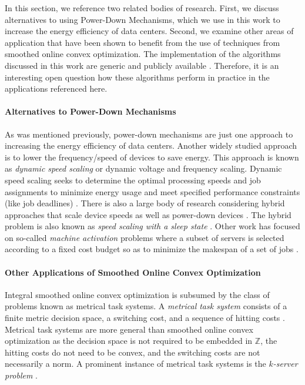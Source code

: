 In this section, we reference two related bodies of research. First, we discuss alternatives to using Power-Down Mechanisms, which we use in this work to increase the energy efficiency of data centers. Second, we examine other areas of application that have been shown to benefit from the use of techniques from smoothed online convex optimization. The implementation of the algorithms discussed in this work are generic and publicly available \cite{Hübotter2021}. Therefore, it is an interesting open question how these algorithms perform in practice in the applications referenced here.

\paragraph{Alternatives to Power-Down Mechanisms} As was mentioned previously, power-down mechanisms are just one approach to increasing the energy efficiency of data centers. Another widely studied approach is to lower the frequency/speed of devices to save energy. This approach is known as \emph{dynamic speed scaling} or dynamic voltage and frequency scaling. Dynamic speed scaling seeks to determine the optimal processing speeds and job assignments to minimize energy usage and meet specified performance constraints (like job deadlines) \cite{Albers2007, Albers2011, Jin2016}. There is also a large body of research considering hybrid approaches that scale device speeds as well as power-down devices \cite{Jin2016}. The hybrid problem is also known as \emph{speed scaling with a sleep state} \cite{Albers2014}. Other work has focused on so-called \emph{machine activation} problems where a subset of servers is selected according to a fixed cost budget so as to minimize the makespan of a set of jobs \cite{Khuller2009, Li2011}.

\paragraph{Other Applications of Smoothed Online Convex Optimization} Integral smoothed online convex optimization is subsumed by the class of problems known as metrical task systems. A \emph{metrical task system} consists of a finite metric decision space, a switching cost, and a sequence of hitting costs \cite{Bubeck2018_3}. Metrical task systems are more general than smoothed online convex optimization as the decision space is not required to be embedded in $\mathbb{Z}$, the hitting costs do not need to be convex, and the switching costs are not necessarily a norm. A prominent instance of metrical task systems is the \emph{$k$-server problem} \cite{Bubeck2017}.

